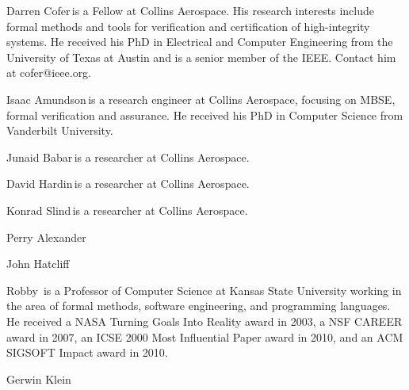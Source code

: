 \begin{IEEEbiography}{Darren Cofer}{\,}is a Fellow at Collins Aerospace. His research interests include formal methods and tools for verification and certification of high-integrity systems. He received his PhD in Electrical and Computer Engineering from the University of Texas at Austin and is a senior member of the IEEE. Contact him at cofer@ieee.org.
\end{IEEEbiography}

\begin{IEEEbiography}{Isaac Amundson}{\,}is a research engineer at Collins Aerospace, focusing on MBSE, formal verification and assurance.  He received his PhD in Computer Science from Vanderbilt University.
\end{IEEEbiography}

\begin{IEEEbiography}{Junaid Babar}{\,}is a researcher at Collins Aerospace.  
\end{IEEEbiography}

\begin{IEEEbiography}{David Hardin}{\,}is a researcher at Collins Aerospace.  
\end{IEEEbiography}

\begin{IEEEbiography}{Konrad Slind}{\,}is a researcher at Collins Aerospace.  
\end{IEEEbiography}

\begin{IEEEbiography}{Perry Alexander}{\,}  
\end{IEEEbiography}

\begin{IEEEbiography}{John Hatcliff}{\,}  
\end{IEEEbiography}

\begin{IEEEbiography}{Robby}{\,}
is a Professor of Computer Science at Kansas State University working
in the area of formal methods, software engineering, and programming languages.
He received a NASA Turning Goals Into Reality award in 2003,
a NSF CAREER award in 2007, an ICSE 2000 Most Influential Paper award in 2010,
and an ACM SIGSOFT Impact award in 2010.
\end{IEEEbiography}

\begin{IEEEbiography}{Gerwin Klein}{\,}  
\end{IEEEbiography}

